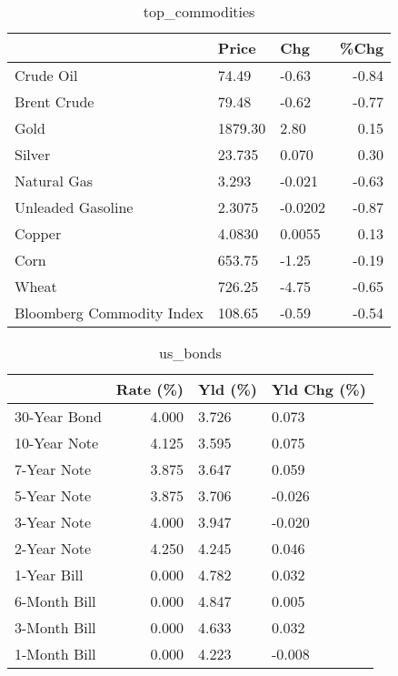 \documentclass{article}%
\begin{document}
\begin{table}[htbp]%
\caption{top\_commodities}%
\centering%
\begin{adjustbox}{width=1\textwidth}%
\begin{tabular}{lllr}
\toprule
                          &   Price &     Chg &  \%Chg \\
\midrule
               Crude Oil  &   74.49 &   -0.63 & -0.84 \\
             Brent Crude  &   79.48 &   -0.62 & -0.77 \\
                    Gold  & 1879.30 &    2.80 &  0.15 \\
                  Silver  &  23.735 &   0.070 &  0.30 \\
             Natural Gas  &   3.293 &  -0.021 & -0.63 \\
       Unleaded Gasoline  &  2.3075 & -0.0202 & -0.87 \\
                  Copper  &  4.0830 &  0.0055 &  0.13 \\
                    Corn  &  653.75 &   -1.25 & -0.19 \\
                   Wheat  &  726.25 &   -4.75 & -0.65 \\
Bloomberg Commodity Index &  108.65 &   -0.59 & -0.54 \\
\bottomrule
\end{tabular}
%
\end{adjustbox}%
\end{table}

%


\begin{table}[htbp]%
\caption{us\_bonds}%
\centering%
\begin{adjustbox}{width=1\textwidth}%
\begin{tabular}{lrll}
\toprule
             &  Rate (\%) & Yld (\%) & Yld Chg (\%) \\
\midrule
30-Year Bond &     4.000 &   3.726 &       0.073 \\
10-Year Note &     4.125 &   3.595 &       0.075 \\
 7-Year Note &     3.875 &   3.647 &       0.059 \\
 5-Year Note &     3.875 &   3.706 &      -0.026 \\
 3-Year Note &     4.000 &   3.947 &      -0.020 \\
 2-Year Note &     4.250 &   4.245 &       0.046 \\
 1-Year Bill &     0.000 &   4.782 &       0.032 \\
6-Month Bill &     0.000 &   4.847 &       0.005 \\
3-Month Bill &     0.000 &   4.633 &       0.032 \\
1-Month Bill &     0.000 &   4.223 &      -0.008 \\
\bottomrule
\end{tabular}
%
\end{adjustbox}%
\end{table}
\end{document}
